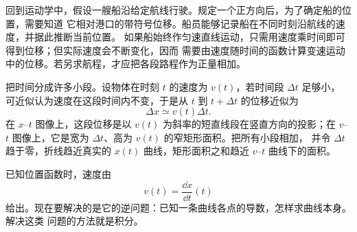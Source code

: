 {\newcommand{\trackTimeSolutionDiagram}{%
\begin{center}
\begin{tikzpicture}[x=0.95cm,y=0.72cm,>=Latex]
  \draw[axis] (0,0)--(6.4,0) node[right] {$x$};
  \draw[axis] (0,0)--(0,4.2) node[above] {$y$};
  \draw[curve] plot[smooth] coordinates
    {(0,3.6) (0.55,2.7) (1.5,2.0) (3.0,1.15) (4.8,0.35) (5.8,0)};
  \coordinate (P) at (1.70,1.88);
  \fill[DeepBlue] (P) circle (2.3pt);
  \draw[guide] (P)--(1.70,3.6);
  \draw[<->] (2.02,1.88)--(2.02,3.6);
  \node[right] at (2.02,2.78) {$H-y$};
  \draw[vector] (P)--++(0.74,-0.43) node[below right] {$\vec v$};
  \node[left] at (0,3.6) {$A(0,H)$};
  \node[below] at (5.8,0) {$B(L,0)$};
  \node[align=left,TextGray] at (4.65,3.8)
    {$\displaystyle v=\sqrt{2g(H-y)}$};
  \node[anchor=north,TextGray] at (3.0,-.45)
    {$\displaystyle \dd t=\frac{\dd s}{v}$};
  \begin{scope}[shift={(3.75,2.25)}]
    \coordinate (U) at (0,0);
    \coordinate (V) at (1.35,0);
    \coordinate (W) at (1.35,-0.78);
    \draw[component] (U)--(V) node[midway,above] {$\dd x$};
    \draw[component] (V)--(W) node[midway,right] {$|\dd y|$};
    \draw[DeepBlue,very thick] (U)--(W) node[midway,below left] {$\dd s$};
    \draw[TextGray,line width=.45pt]
      ($(V)+(-.14,0)$)--($(V)+(-.14,-.14)$)--($(V)+(0,-.14)$);
  \end{scope}
\end{tikzpicture}
\end{center}}


回到运动学中，假设一艘船沿给定航线行驶。规定一个正方向后，为了确定船的位置，需要知道
它相对港口的带符号位移。船员能够记录船在不同时刻沿航线的速度，并据此推断当前位置。
如果船始终作匀速直线运动，只需用速度乘时间即可得到位移；但实际速度会不断变化，因而
需要由速度随时间的函数计算变速运动中的位移。若另求航程，才应把各段路程作为正量相加。

\partitionDiagram

把时间分成许多小段。设物体在时刻 $t$ 的速度为 $v(t)$，若时间段 $\Delta t$ 足够小，
可近似认为速度在这段时间内不变，于是从 $t$ 到 $t+\Delta t$ 的位移近似为
\begin{equation}
 \Delta x\simeq v(t)\Delta t.
\end{equation}
在 $x$--$t$ 图像上，这段位移是以 $v(t)$ 为斜率的短直线段在竖直方向的投影；在
$v$--$t$ 图像上，它是宽为 $\Delta t$、高为 $v(t)$ 的窄矩形面积。把所有小段相加，
并令 $\Delta t$ 趋于零，折线趋近真实的 $x(t)$ 曲线，矩形面积之和趋近 $v$--$t$
曲线下的面积。

已知位置函数时，速度由
\begin{equation}
 v(t)=\frac{\dd x}{\dd t}(t)
\end{equation}
给出。现在要解决的是它的逆问题：已知一条曲线各点的导数，怎样求曲线本身。解决这类
问题的方法就是积分。

}
